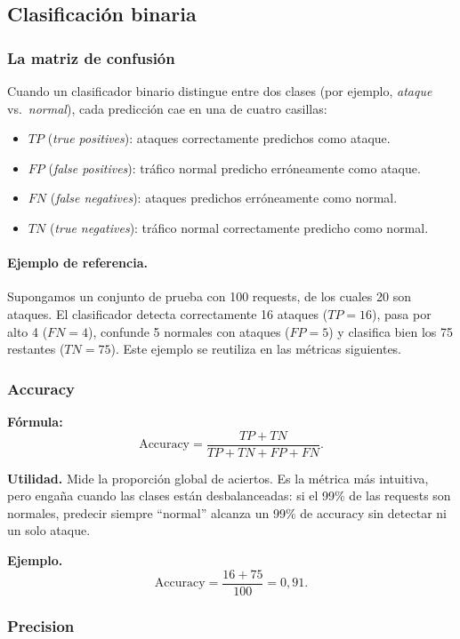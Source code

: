 \documentclass[12pt,oneside]{report}
\begin{document}
\subsection{Clasificación binaria}

\subsubsection{La matriz de confusión}

Cuando un clasificador binario distingue entre dos clases (por ejemplo,
\emph{ataque} vs.\ \emph{normal}), cada predicción cae en una de cuatro
casillas:
\begin{itemize}[leftmargin=*]
  \item $TP$ (\emph{true positives}): ataques correctamente predichos como ataque.
  \item $FP$ (\emph{false positives}): tráfico normal predicho erróneamente como ataque.
  \item $FN$ (\emph{false negatives}): ataques predichos erróneamente como normal.
  \item $TN$ (\emph{true negatives}): tráfico normal correctamente predicho como normal.
\end{itemize}

\paragraph{Ejemplo de referencia.} Supongamos un conjunto de prueba con
100 requests, de los cuales 20 son ataques. El clasificador detecta
correctamente 16 ataques ($TP=16$), pasa por alto 4 ($FN=4$), confunde 5
normales con ataques ($FP=5$) y clasifica bien los 75 restantes
($TN=75$). Este ejemplo se reutiliza en las métricas siguientes.

\subsubsection{Accuracy}

\textbf{Fórmula:}
\[
\mathrm{Accuracy}=\frac{TP+TN}{TP+TN+FP+FN}.
\]

\textbf{Utilidad.} Mide la proporción global de aciertos. Es la métrica
más intuitiva, pero engaña cuando las clases están desbalanceadas: si el
99\% de las requests son normales, predecir siempre ``normal'' alcanza
un 99\% de accuracy sin detectar ni un solo ataque.

\textbf{Ejemplo.}
\[
\mathrm{Accuracy}=\frac{16+75}{100}=0{,}91.
\]

\subsubsection{Precision}
\end{document}
